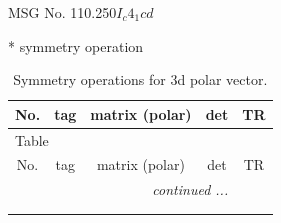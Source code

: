\documentclass[fleqn,8pt]{jsarticle}
\begin{document}
\setcounter{MaxMatrixCols}{32}

\renewcommand{\tablename}{Table~}
\renewcommand{\figurename}{Figure~}
\begin{center}
\LARGE
MSG No. 110.250\quad$I_{c}4_{1}cd$
\end{center}
* symmetry operation
\renewcommand{\arraystretch}{1.3}
\begin{longtable}{ccccc}
\caption{Symmetry operations for 3d polar vector.}
 \\
 \hline \hline
No. & tag & matrix (polar) & det & TR \\ \hline \endfirsthead

\multicolumn{4}{l}{\tablename\ \thetable{}} \\
 \hline \hline
No. & tag & matrix (polar) & det & TR \\ \hline \endhead

 \hline \hline
\multicolumn{4}{r}{\footnotesize\it continued ...} \\ \endfoot

 \hline \hline
\multicolumn{4}{r}{} \\ \endlastfoot


\end{longtable}
\end{document}
